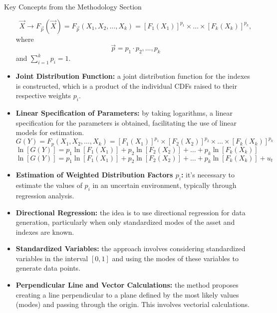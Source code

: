 \documentclass{beamer}
\begin{document}
\begin{frame}[allowframebreaks]{Key Concepts from the Methodology Section}
\begin{itemize}
       	\begin{equation}
       		\overrightarrow{X} \rightarrow F_{\vec{p}}(\overrightarrow{X}) = F_{\vec{p}}(X_{1}, X_{2}, \ldots, X_{k}) = [F_{1}(X_{1})]^{p_1} \times \ldots \times [F_{k}(X_{k})]^{p_k},
       	\end{equation}
        where \[\vec{p} = p_{1} \cdot p_{2}, \ldots, p_{k}\] and \(\sum_{i=1}^{k} p_{i} = 1\).
       	\item \textbf{Joint Distribution Function:} a joint distribution function for the indexes is constructed, which is a product of the individual CDFs raised to their respective weights \(p_{i}\).
       	\item \textbf{Linear Specification of Parameters:} by taking logarithms, a linear specification for the parameters is obtained, facilitating the use of linear models for estimation.
       	\small
       	\begin{equation}
       		G(Y) = F_{p} (X_{1}, X_{2}, \ldots, X_{k}) = [F_{1}(X_{1})]^{p_1} \times [F_{2}(X_{2})]^{p_2} \times \ldots \times [F_{k}(X_{k})]^{p_k}
       	\end{equation}
        \begin{equation}
        	\ln[G(Y)] = p_{1} \ln [F_{1}(X_{1})] + p_{2} \ln [F_{2}(X_{2})] + \ldots + p_{k} \ln [F_{k}(X_{k})]
        \end{equation}
        \begin{equation}
        \ln[G(Y)] = p_{1} \ln [F_{1}(X_{1})] + p_{2} \ln [F_{2}(X_{2})] + \ldots + p_{k} \ln [F_{k}(X_{k})] + u_{t}
        \end{equation}
        \normalsize
       	\item \textbf{Estimation of Weighted Distribution Factors \(p_{i}\):} it's necessary to estimate the values of \(p_{i}\) in an uncertain environment, typically through regression analysis.
       	\item \textbf{Directional Regression:} the idea is to use directional regression for data generation, particularly when only standardized modes of the asset and indexes are known.
       	\item \textbf{Standardized Variables:} the approach involves considering standardized variables in the interval \([0,1]\) and using the modes of these variables to generate data points.
       	\item \textbf{Perpendicular Line and Vector Calculations:} the method proposes creating a line perpendicular to a plane defined by the most likely values (modes) and passing through the origin. This involves vectorial calculations.

\end{itemize}
\end{frame}
\end{document}
